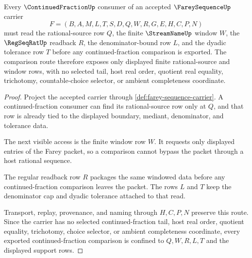 

\begin{theorem}
\label{thm:farey-sequence-continued-fraction-window}
Every $\ContinuedFractionUp$ consumer of an accepted $\FareySequenceUp$ carrier
$$
F=(B,A,M,L,T,S,D,Q,W,R,G,E,H,C,P,N)
$$
must read the rational-source row $Q$, the finite $\StreamNameUp$ window $W$, the $\RegSeqRatUp$ readback $R$, the denominator-bound row $L$, and the dyadic tolerance row $T$ before any continued-fraction comparison is exported. The comparison route therefore exposes only displayed finite rational-source and window rows, with no selected tail, host real order, quotient real equality, trichotomy, countable-choice selector, or ambient completeness coordinate.
\end{theorem}
\begin{proof}
Project the accepted carrier through \autoref{def:farey-sequence-carrier}. A continued-fraction consumer can find its rational-source row only at $Q$, and that row is already tied to the displayed boundary, mediant, denominator, and tolerance data.

The next visible access is the finite window row $W$. It requests only displayed entries of the Farey packet, so a comparison cannot bypass the packet through a host rational sequence.

The regular readback row $R$ packages the same windowed data before any continued-fraction comparison leaves the packet. The rows $L$ and $T$ keep the denominator cap and dyadic tolerance attached to that read.

Transport, replay, provenance, and naming through $H,C,P,N$ preserve this route. Since the carrier has no selected continued-fraction tail, host real order, quotient equality, trichotomy, choice selector, or ambient completeness coordinate, every exported continued-fraction comparison is confined to $Q,W,R,L,T$ and the displayed support rows.
\end{proof}


